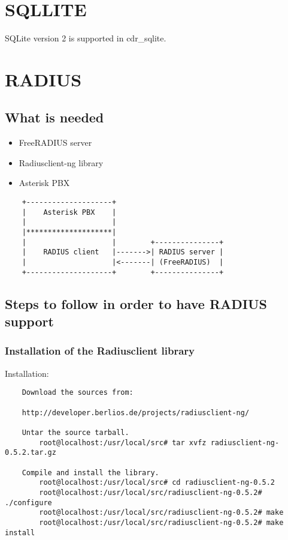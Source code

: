 \section{SQLLITE}

SQLite version 2 is supported in cdr\_sqlite.

\section{RADIUS}

\subsection{What is needed}

\begin{itemize}
	\item FreeRADIUS server
	\item Radiusclient-ng library
	\item Asterisk PBX
\end{itemize}

\begin{verbatim}
	+--------------------+
	|    Asterisk PBX    |
	|                    |
	|********************|
	|                    |        +---------------+
	|    RADIUS client   |------->| RADIUS server |
	|                    |<-------| (FreeRADIUS)  |
	+--------------------+        +---------------+
\end{verbatim}



\subsection{Steps to follow in order to have RADIUS support}

\subsubsection{Installation of the Radiusclient library}
   Installation:
\begin{verbatim}	
	Download the sources from:
		
	http://developer.berlios.de/projects/radiusclient-ng/
		
	Untar the source tarball.
		root@localhost:/usr/local/src# tar xvfz radiusclient-ng-0.5.2.tar.gz

	Compile and install the library.
		root@localhost:/usr/local/src# cd radiusclient-ng-0.5.2
		root@localhost:/usr/local/src/radiusclient-ng-0.5.2# ./configure
		root@localhost:/usr/local/src/radiusclient-ng-0.5.2# make
		root@localhost:/usr/local/src/radiusclient-ng-0.5.2# make install
\end{verbatim}


